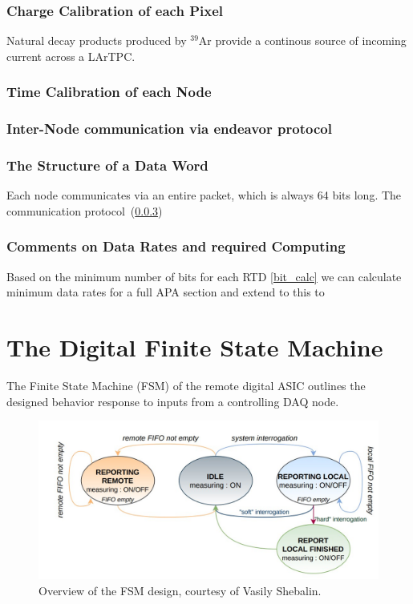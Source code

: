 \subsubsection{Charge Calibration of each Pixel}

Natural decay products produced by $^39$Ar provide a continous source of incoming current across a LArTPC.


\subsubsection{Time Calibration of each Node}

\subsubsection{Inter-Node communication via endeavor protocol}
\label{sect:endeavor}


\subsubsection{The Structure of a Data Word}

Each node communicates via an entire packet, which is always 64 bits long. 
The communication protocol~(\ref{sect:endeavor})

\subsubsection{Comments on Data Rates and required Computing}

Based on the minimum number of bits for each RTD \ref{bit_calc} we can calculate minimum data rates for a full APA section and extend to this to 


\section{The Digital Finite State Machine}

The Finite State Machine (FSM) of the remote digital ASIC outlines the designed behavior response to inputs from a controlling DAQ node.

\begin{figure}[ht!]
\centering
\includegraphics[width=\textwidth]{images/digital_fsm_overview.jpg}
\caption{Overview of the FSM design, courtesy of Vasily Shebalin.}
\end{figure}

